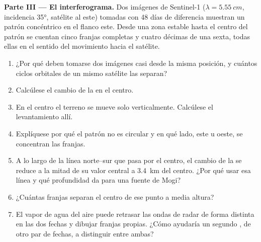 \begin{problem}
\medskip\noindent\textbf{Parte III --- El interferograma.} Dos imágenes de Sentinel-1
($\lambda = \qty{5.55}{cm}$, incidencia \ang{35}, satélite al
este) tomadas con 48 días de diferencia muestran un patrón concéntrico en el flanco este. Desde una
zona estable hasta el centro del patrón se cuentan cinco franjas completas y
cuatro décimas de una sexta, todas ellas en el sentido del movimiento hacia el
satélite.
\begin{enumerate}[resume]
\item ¿Por qué deben tomarse dos imágenes casi desde la misma posición, y cuántos
  ciclos orbitales de un mismo satélite las separan?
\item Calcúlese el cambio de la  en el centro.
\item En el centro el terreno se mueve solo verticalmente. Calcúlese el levantamiento
  allí.
\item Explíquese por qué el patrón no es circular y en qué lado, este u oeste,
  se concentran las franjas.
\item A lo largo de la línea norte--sur que pasa por el centro, el cambio de la
   se reduce a la mitad de su valor central a \qty{3.4}{km} del
  centro. ¿Por qué usar esa línea y qué profundidad da para una fuente
  de Mogi?
\item ¿Cuántas franjas separan el centro de ese punto a media altura?
\item El vapor de agua del aire puede retrasar las ondas de radar de forma distinta en las
  dos fechas y dibujar franjas propias. ¿Cómo ayudaría un segundo ,
  de otro par de fechas, a distinguir entre ambas?
\end{enumerate}


\end{problem}
